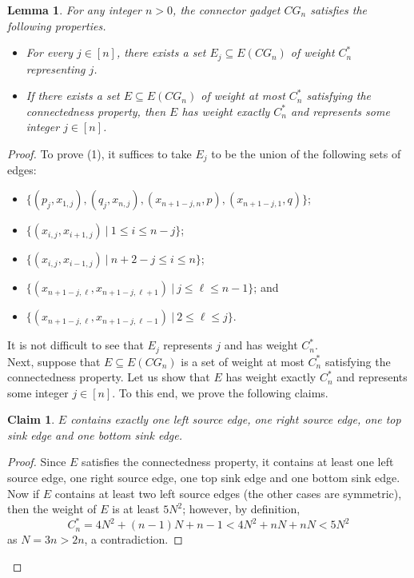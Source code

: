 \documentclass[a4paper,11pt]{article}
\theoremstyle{plain}
\newtheorem{lemma}[theorem]{Lemma}
\newtheorem{claim}[theorem]{Claim}
\newtheorem{identification rule}{Identification Rule}
\theoremstyle{definition}
\theoremstyle{remark}
\newenvironment{claimproof}{\begin{proof}\renewcommand{\qedsymbol}{\claimqed}}{\end{proof}\renewcommand{\qedsymbol}{\plainqed}}
\let\plainqed\qedsymbol
\newcommand{\claimqed}{$\lrcorner$}
\begin{document}
\begin{lemma}
\label{lem:cg}
For any integer $n > 0$, the connector gadget $CG_n$ satisfies the following properties.
\begin{itemize}
\item[(1)] For every $j \in [n]$, there exists a set $E_j \subseteq E(CG_n)$ of weight $C_n^*$ representing $j$.
\item[(2)] If there exists a set $E \subseteq E(CG_n)$ of weight at most $C_n^*$ satisfying the connectedness property, then $E$ has weight exactly $C_n^*$ and represents some integer $j \in [n]$.
\end{itemize}
\end{lemma}

\begin{proof}
To prove (1), it suffices to take $E_j$ to be the union of the following sets of edges:
\begin{itemize}
\item $\{(p_j,x_{1,j}),(q_j,x_{n,j}),(x_{n+1-j,n},p),(x_{n+1-j,1},q)\}$; 
\item $\{(x_{i,j},x_{i+1,j})~|~1 \leq i \leq n-j\}$; 
\item $\{(x_{i,j},x_{i-1,j})~|~n+2-j \leq i \leq n\}$; 
\item $\{(x_{n+1-j,\ell}, x_{n+1-j,\ell+1})~|~j \leq \ell \leq n-1\}$; and
\item $\{(x_{n+1-j,\ell},x_{n+1-j,\ell -1})~|~2 \leq \ell \leq j\}$.
\end{itemize}
It is not difficult to see that $E_j$ represents $j$ and has weight $C_n^*$.\\

Next, suppose that $E \subseteq E(CG_n)$ is a set of weight at most $C_n^*$ satisfying the connectedness property. Let us show that $E$ has weight exactly $C_n^*$ and represents some integer $j \in [n]$. To this end, we prove the following claims.

\begin{claim}
\label{clm:sourcesinkedges}
$E$ contains exactly one left source edge, one right source edge, one top sink edge and one bottom sink edge.
\end{claim}

\begin{claimproof}
Since $E$ satisfies the connectedness property, it contains at least one left source edge, one right source edge, one top sink edge and one bottom sink edge. Now if $E$ contains at least two left source edges (the other cases are symmetric), then the weight of $E$ is at least $5N^2$; however, by definition,
\[
C_n^*  = 4N^2 + (n-1)N+ n-1 < 4N^2 + nN + nN < 5N^2
\]
as $N = 3n > 2n$, a contradiction.
\end{claimproof}


\end{proof}
\end{document}
